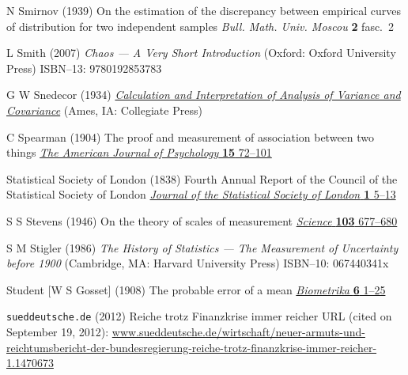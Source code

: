 \begin{thebibliography}{99}
N Smirnov
(1939) On the estimation of the discrepancy between empirical 
curves of distribution for two independent samples
\textit{Bull. Math. Univ. Moscou} \textbf{2} fasc.~2

L Smith
(2007) \textit{Chaos --- A Very Short Introduction}
(Oxford: Oxford University Press)
ISBN--13: 9780192853783

G W Snedecor
(1934) 
\href{http://dx.doi.org/10.1037/13308-000}{\textit{Calculation 
and Interpretation of Analysis of Variance and Covariance}}
(Ames, IA: Collegiate Press)


C Spearman
(1904) The proof and measurement of association between two things
\href{http://www.jstor.org/stable/1412159}{\textit{The Ameri\-can 
Journal of Psychology} \textbf{15} 72--101}

Statistical Society of London
(1838) Fourth Annual Report of the Council of the Statistical 
Society of London
\href{http://www.jstor.org/stable/2337850}{\textit{Journal of the 
Statistical Society of London} \textbf{1} 5--13}

S S Stevens
(1946) On the theory of scales of measurement
\href{https://doi.org/10.1126/science.103.2684.677}{\textit{Science}
\textbf{103} 677--680}

S M Stigler
(1986) \textit{The History of Statistics --- The Measurement of 
Uncertainty before 1900} (Cambridge, MA: Harvard University 
Press)
ISBN--10: 067440341x

Student [W S Gosset]
(1908) The probable error of a mean
\href{http://dx.doi.org/10.1093/biomet/6.1.1}{\textit{Biometrika} 
\textbf{6} 1--25}

{\tt sueddeutsche.de} (2012)
Reiche trotz Finanzkrise immer reicher
URL (cited on September 19, 2012):
\href{http://www.sueddeutsche.de/wirtschaft/neuer-armuts-und-reichtumsbericht-der-bundesregierung-reiche-trotz-finanzkrise-immer-reicher-1.1470673}{www.sueddeutsche.de/wirtschaft/neuer-armuts-und-reichtumsbericht-der-bundesregierung-reiche-trotz-finanzkrise-immer-reicher-1.1470673}


\end{thebibliography}
